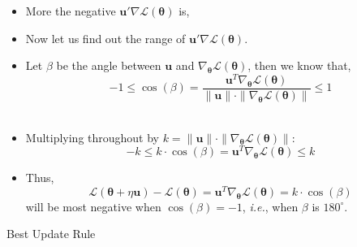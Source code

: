 \documentclass[10pt, aspectratio=169]{beamer}
\begin{document}
\begin{frame}
\begin{itemize}
\item<1-> More the negative $\symbf{u}' \nabla \mathscr{L}(\symbf{\theta})$ is, \\[0.5em]
\hspace{5cm} 
\vspace{1cm}
\item<3-> Now let us find out the range of $\symbf{u}' \nabla \mathscr{L}(\symbf{\theta})$.
\end{itemize}
\end{frame}



\begin{frame}
\begin{itemize}
\item<1-> Let $\beta$ be the angle between $\symbf{u}$ and $\nabla_{\symbf{\theta}} \mathscr{L}(\symbf{\theta})$, then we know that,
\[
-1 \leq \cos(\beta) = \dfrac{\symbf{u}^T \nabla_{\symbf{\theta}} \mathscr{L}(\symbf{\theta})}{\|\symbf{u}\| \cdot \|\nabla_{\symbf{\theta}} \mathscr{L}(\symbf{\theta})\|} \leq 1
\] \\[0.5em]

\item<2-> Multiplying throughout by $k = \|\symbf{u}\| \cdot \|\nabla_{\symbf{\theta}} \mathscr{L}(\symbf{\theta})\|$:
\[
-k \leq k \cdot \cos(\beta) = \symbf{u}^T \nabla_{\symbf{\theta}} \mathscr{L}(\symbf{\theta}) \leq k
\]

\item<3-> Thus,
\[
\mathscr{L}(\symbf{\theta} + \eta \symbf{u}) - \mathscr{L}(\symbf{\theta}) = \symbf{u}^T \nabla_{\symbf{\theta}} \mathscr{L}(\symbf{\theta}) = k \cdot \cos(\beta)
\]
will be most negative when $\cos(\beta) = -1$, \textit{i.e.}, when $\beta$ is $180^\circ$.
\end{itemize}
\end{frame}


\begin{frame}
\begin{block}{Best Update Rule}
 \\[0.5em]
\end{block}

\end{frame}
\end{document}
